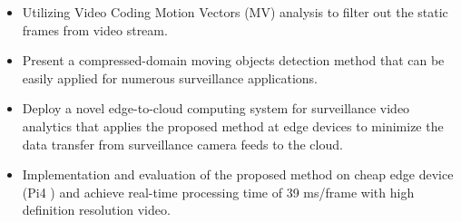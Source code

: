 \begin{itemize}
\item Utilizing Video Coding Motion Vectors (MV) analysis to filter out the static frames from video stream.
\item Present a compressed-domain moving objects detection method that can be easily applied for numerous surveillance applications.
\item Deploy a novel edge-to-cloud computing system for surveillance video analytics that applies the proposed method at edge devices to minimize the data transfer from surveillance camera feeds to the cloud.
\item Implementation and evaluation of the proposed method on cheap edge device (Pi4 ) and achieve real-time processing time of  39 ms/frame with high definition resolution video.
\end{itemize}
%
%
